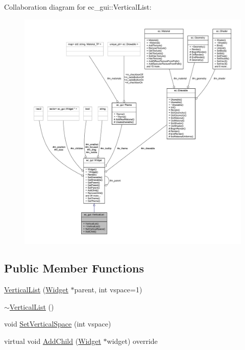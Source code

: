 Collaboration diagram for ec\+\_\+gui\+:\+:Vertical\+List\+:
\nopagebreak
\begin{figure}[H]
\begin{center}
\leavevmode
\includegraphics[width=350pt]{classec__gui_1_1_vertical_list__coll__graph}
\end{center}
\end{figure}
\subsection*{Public Member Functions}
\begin{DoxyCompactItemize}
\item 
\mbox{\hyperlink{classec__gui_1_1_vertical_list_af7c9ad4079944e77219be0a3bf623278}{Vertical\+List}} (\mbox{\hyperlink{classec__gui_1_1_widget}{Widget}} $\ast$parent, int vspace=1)
\item 
\mbox{\hyperlink{classec__gui_1_1_vertical_list_acf95f2d95ebe84bcbaf7679093281241}{$\sim$\+Vertical\+List}} ()
\item 
void \mbox{\hyperlink{classec__gui_1_1_vertical_list_ab7b23229f0082d66d5880cb24d63fc51}{Set\+Vertical\+Space}} (int vspace)
\item 
virtual void \mbox{\hyperlink{classec__gui_1_1_vertical_list_a3333415b5bef7e007bc5f62126efa620}{Add\+Child}} (\mbox{\hyperlink{classec__gui_1_1_widget}{Widget}} $\ast$widget) override
\end{DoxyCompactItemize}
